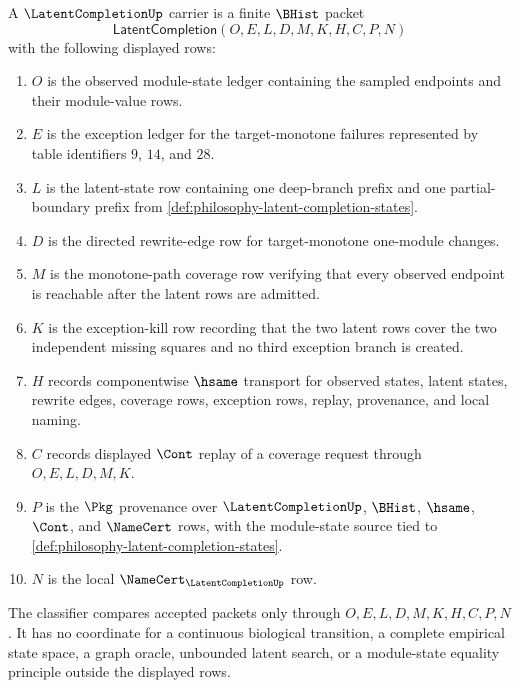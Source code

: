 \begin{definition}
\label{def:latent-completion-carrier}
A $\LatentCompletionUp$ carrier is a finite $\BHist$ packet
$$
\mathsf{LatentCompletion}(O,E,L,D,M,K,H,C,P,N)
$$
with the following displayed rows:
\begin{enumerate}
\item $O$ is the observed module-state ledger containing the sampled endpoints and their module-value rows.
\item $E$ is the exception ledger for the target-monotone failures represented by table identifiers $9$, $14$, and $28$.
\item $L$ is the latent-state row containing one deep-branch prefix and one partial-boundary prefix from \autoref{def:philosophy-latent-completion-states}.
\item $D$ is the directed rewrite-edge row for target-monotone one-module changes.
\item $M$ is the monotone-path coverage row verifying that every observed endpoint is reachable after the latent rows are admitted.
\item $K$ is the exception-kill row recording that the two latent rows cover the two independent missing squares and no third exception branch is created.
\item $H$ records componentwise $\hsame$ transport for observed states, latent states, rewrite edges, coverage rows, exception rows, replay, provenance, and local naming.
\item $C$ records displayed $\Cont$ replay of a coverage request through $O,E,L,D,M,K$.
\item $P$ is the $\Pkg$ provenance over $\LatentCompletionUp$, $\BHist$, $\hsame$, $\Cont$, and $\NameCert$ rows, with the module-state source tied to \autoref{def:philosophy-latent-completion-states}.
\item $N$ is the local $\NameCert_{\LatentCompletionUp}$ row.
\end{enumerate}
The classifier compares accepted packets only through $O,E,L,D,M,K,H,C,P,N$. It has no coordinate for a continuous biological transition, a complete empirical state space, a graph oracle, unbounded latent search, or a module-state equality principle outside the displayed rows.
\end{definition}

